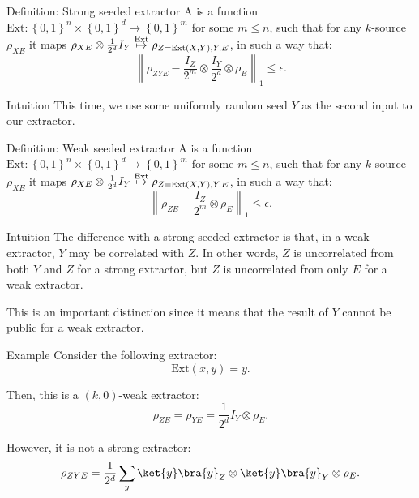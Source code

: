 \documentclass[a4paper]{article}
\begin{document}
\begin{parag}{Definition: Strong seeded extractor}
    A  is a function $\text{Ext}: \left\{0, 1\right\}^n \times \left\{0, 1\right\}^d \mapsto \left\{0, 1\right\}^m$ for some $m \leq n$, such that for any $k$-source $\rho_{XE}$ it maps $\rho_{XE} \otimes \frac{1}{2^d} I_Y \over{\mapsto}{Ext} \rho_{Z = \text{Ext}\left(X, Y\right), Y, E}$, in such a way that:
    \[\left\|\rho_{Z Y E} - \frac{I_Z}{2^m} \otimes \frac{I_Y}{2^d} \otimes \rho_E \right\|_1 \leq \epsilon.\]

    \begin{subparag}{Intuition}
        This time, we use some uniformly random seed $Y$ as the second input to our extractor.
    \end{subparag}
\end{parag}

\begin{parag}{Definition: Weak seeded extractor}
    A  is a function $\text{Ext}: \left\{0, 1\right\}^n \times \left\{0, 1\right\}^d \mapsto \left\{0, 1\right\}^m$ for some $m \leq n$, such that for any $k$-source $\rho_{XE}$ it maps $\rho_{XE} \otimes \frac{1}{2^d} I_Y \over{\mapsto}{Ext} \rho_{Z = \text{Ext}\left(X, Y\right), Y, E}$, in such a way that: 
    \[\left\|\rho_{Z E} - \frac{I_Z}{2^m} \otimes \rho_E \right\|_1 \leq \epsilon.\]

    \begin{subparag}{Intuition}
        The difference with a strong seeded extractor is that, in a weak extractor, $Y$ may be correlated with $Z$. In other words, $Z$ is uncorrelated from both $Y$ and $Z$ for a strong extractor, but $Z$ is uncorrelated from only $E$ for a weak extractor.

        This is an important distinction since it means that the result of $Y$ cannot be public for a weak extractor.
    \end{subparag}

    \begin{subparag}{Example}
        Consider the following extractor: 
        \[\text{Ext}\left(x, y\right) = y.\]
        
        Then, this is a $\left(k, 0\right)$-weak extractor: 
        \[\rho_{ZE} = \rho_{YE} = \frac{1}{2^d} I_Y \otimes \rho_E.\]

        However, it is not a strong extractor:
        \[\rho_{ZYE} = \frac{1}{2^d} \sum_{y} \ket{y}\bra{y}_Z \otimes \ket{y}\bra{y}_Y \otimes \rho_E.\]
    \end{subparag}
\end{parag}
\end{document}
